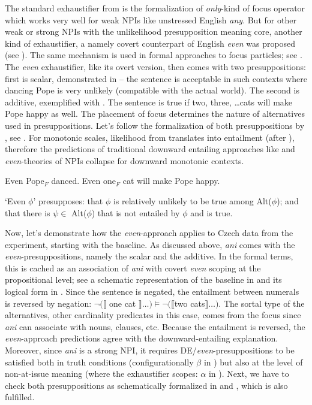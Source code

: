 The standard exhaustifier from  is the formalization of \textit{only}-kind of focus operator which works very well for weak NPIs like unstressed English \textit{any}. But for other weak or strong NPIs with the unlikelihood presupposition meaning core, another kind of exhaustifier, a namely covert counterpart of English \textit{even} was proposed (see \citealt{crnic2011getting,crnivc2014against}). The same mechanism is used in formal approaches to focus particles; see \citet{panizza2020minimal}. The \textit{even} exhaustifier, like its overt version, then comes with two presuppositions: first is scalar, demonstrated in  -- the sentence is acceptable in such contexts where dancing Pope is very unlikely (compatible with the actual world). The second is additive, exemplified with . The sentence is true if two, three, \ldots cats will make Pope happy as well. The placement of focus determines the nature of alternatives used in presuppositions. Let's follow the formalization of both presuppositions by \citet{panizza2020minimal}, see . For monotonic scales, likelihood from  translates into entailment (after \citealt{crnic2011getting}), therefore the predictions of traditional downward entailing approaches like \citep{ladusaw1992expressing} and \textit{even}-theories of NPIs collapse for downward monotonic contexts.


\ea\label{ex-10} \ea\label{ex-10-a} Even Pope\(_F\) danced. 
\ex\label{ex-10-b} Even one\(_F\) cat will make Pope happy.\z\z

\ea\label{ex-11} `Even \(\phi\)' presupposes: 
\ea that \(\phi\) is relatively unlikely to be true among Alt(\(\phi\)); and 
\ex that there is \(\psi \in\) Alt(\(\phi\)) that is not entailed by \(\phi\) and is true.\z\z

Now, let's demonstrate how the \textit{even}-approach applies to Czech data from the experiment, starting with the baseline. As discussed above, \textit{ani} comes with the \textit{even}-presuppositions, namely the scalar and the additive. In the formal terms, this is cached as an association of \textit{ani} with covert \textit{even} scoping at the propositional level; see a schematic representation of the baseline in  and its logical form in . Since the sentence is negated, the entailment between numerals is reversed by negation:
\(\neg (\llbracket\) one cat \(\rrbracket \ldots) \models \neg(\llbracket\)two
cats\(\rrbracket \ldots)\). The sortal type of the alternatives, other cardinality predicates in this case, comes from the focus since \textit{ani} can associate with nouns, clauses, etc. Because the entailment is reversed, the \emph{even}-approach predictions agree with the downward-entailing explanation. Moreover, since \textit{ani} is a strong NPI, it requires DE/\textit{even}-presuppositions to be satisfied both in truth conditions (configurationally $\beta$ in ) but also at the level of non-at-issue meaning (where the exhaustifier scopes: $\alpha$ in ). Next, we have to check both presuppositions as schematically formalized in  and , which is also fulfilled.

